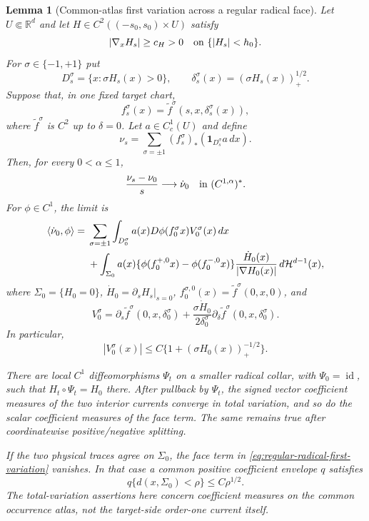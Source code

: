 \documentclass[11pt]{article}
\newtheorem{lemma}[theorem]{Lemma}
\newcommand{\one}{\mathbf 1}
\begin{document}
\begin{lemma}[Common-atlas first variation across a regular radical face]
\label{lem:regular-radical-common-atlas}
Let $U\Subset\mathbb R^d$ and let
$H\in C^2((-s_0,s_0)\times U)$ satisfy
\[
 |\nabla_xH_s|\ge c_H>0
 \quad\hbox{on }\{|H_s|<h_0\}.
\]
For $\sigma\in\{-1,+1\}$ put
\[
 D_s^\sigma=\{x:\sigma H_s(x)>0\},\qquad
 \delta_s^\sigma(x)=(\sigma H_s(x))_+^{1/2}.
\]
Suppose that, in one fixed target chart,
\[
 f_s^\sigma(x)
 =\widetilde f^\sigma(s,x,\delta_s^\sigma(x)),
\]
where $\widetilde f^\sigma$ is $C^2$ up to $\delta=0$.  Let
$a\in C_c^1(U)$ and define
\[
 \nu_s=\sum_{\sigma=\pm1}
 (f_s^\sigma)_*(\one_{D_s^\sigma}a\,dx).
\]
Then, for every $0<\alpha\le1$,
\[
 \frac{\nu_s-\nu_0}{s}\longrightarrow\dot\nu_0
 \quad\hbox{in }(C^{1,\alpha})^*.
\]
For $\phi\in C^1$, the limit is
\begin{align}
 \langle\dot\nu_0,\phi\rangle
={}&\sum_{\sigma=\pm1}
 \int_{D_0^\sigma}
 a(x)D\phi(f_0^\sigma x)V_0^\sigma(x)\,dx \notag\\
 &+\int_{\Sigma_0}a(x)
 \{\phi(f_0^{+,0}x)-\phi(f_0^{-,0}x)\}
 \frac{\dot H_0(x)}{|\nabla H_0(x)|}\,
 d\mathcal H^{d-1}(x),
\label{eq:regular-radical-first-variation}
\end{align}
where $\Sigma_0=\{H_0=0\}$,
$\dot H_0=\partial_sH_s|_{s=0}$,
$f_0^{\sigma,0}(x)=\widetilde f^\sigma(0,x,0)$, and
\[
 V_0^\sigma
 =\partial_s\widetilde f^\sigma
   (0,x,\delta_0^\sigma)
 +\frac{\sigma\dot H_0}
 {2\delta_0^\sigma}
 \partial_\delta\widetilde f^\sigma
   (0,x,\delta_0^\sigma).
\]
In particular,
\[
 |V_0^\sigma(x)|
 \le C\{1+(\sigma H_0(x))_+^{-1/2}\}.
\]

There are local $C^1$ diffeomorphisms $\Psi_t$ on a smaller radical
collar, with $\Psi_0=\operatorname{id}$, such that
$H_t\circ\Psi_t=H_0$ there.  After pullback by $\Psi_t$, the signed vector
coefficient measures of the two interior currents converge in total
variation, and so do the scalar coefficient measures of the face term.
The same remains true after coordinatewise positive/negative splitting.

If the two physical traces agree on $\Sigma_0$, the face term in
\eqref{eq:regular-radical-first-variation} vanishes.  In that case a common
positive coefficient envelope $q$ satisfies
\begin{equation}
\label{eq:regular-radical-half-tightness}
 q\{d(x,\Sigma_0)<\rho\}\le C\rho^{1/2}.
\end{equation}
The total-variation assertions here concern coefficient measures on the
common occurrence atlas, not the target-side order-one current itself.
\end{lemma}
\end{document}
